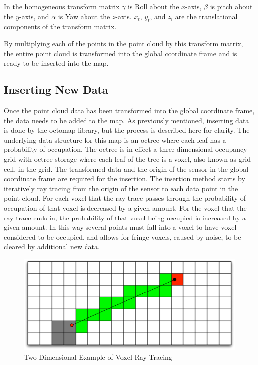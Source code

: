 \documentclass[12pt]{report}
\begin{document}
In the homogeneous transform matrix $\gamma$ is Roll about the $x$-axis, $\beta$ is pitch about the $y$-axis, and $\alpha$ is Yaw about the $z$-axis.  $x_{t}$, $y_{t}$, and $z_{t}$ are the translational components of the transform matrix.

By multiplying each of the points in the point cloud by this transform matrix, the entire point cloud is transformed into the global coordinate frame and is ready to be inserted into the map.

\subsection{Inserting New Data}
Once the point cloud data has been transformed into the global coordinate frame, the data needs to be added to the map. As previously mentioned, inserting data is done by the octomap library, but the process is described here for clarity. The underlying data structure for this map is an octree where each leaf has a probability of occupation. The octree is in effect a three dimensional occupancy grid with octree storage where each leaf of the tree is a voxel, also known as grid cell, in the grid. The transformed data and the origin of the sensor in the global coordinate frame are required for the insertion. The insertion method starts by iteratively ray tracing from the origin of the sensor to each data point in the point cloud.  For each voxel that the ray trace passes through the probability of occupation of that voxel is decreased by a given amount. For the voxel that the ray trace ends in, the probability of that voxel being occupied is increased by a given amount. In this way several points must fall into a voxel to have voxel considered to be occupied, and allows for fringe voxels, caused by noise, to be cleared by additional new data.

\begin{figure}[ht]
  \centering
  \includegraphics[width=5in,keepaspectratio]{raytrace.pdf}
  \caption{Two Dimensional Example of Voxel Ray Tracing}
  \label{fig:voxel_raytrace}
\end{figure}
\end{document}
